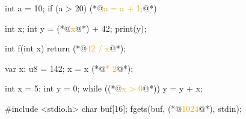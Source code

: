 \documentclass{article}
\begin{document}
\begin{lnSnippet}
int a = 10;
if (a > 20) {
  (*@\textcolor{orange}{a = a + 1;}@*)
}
\end{lnSnippet}
\begin{lnSnippet}
int x;
int y = (*@\textcolor{orange}{x}@*) + 42;
print(y);
\end{lnSnippet}
\begin{lnSnippet}
int f(int x) {
  return (*@\textcolor{orange}{42 / x}@*);
}
\end{lnSnippet}
\begin{lnSnippet}
var x: u8 = 142;
x = x (*@\textcolor{orange}{* 2}@*);
\end{lnSnippet}
\begin{lnSnippet}
int x = 5;
int y = 0;
while ((*@\textcolor{orange}{x > 0}@*)) {
  y = y + x; }
\end{lnSnippet}
\begin{lnSnippet}
#include <stdio.h>
char buf[16];
fgets(buf, (*@\textcolor{orange}{1024}@*), stdin);
\end{lnSnippet}
\end{document}
